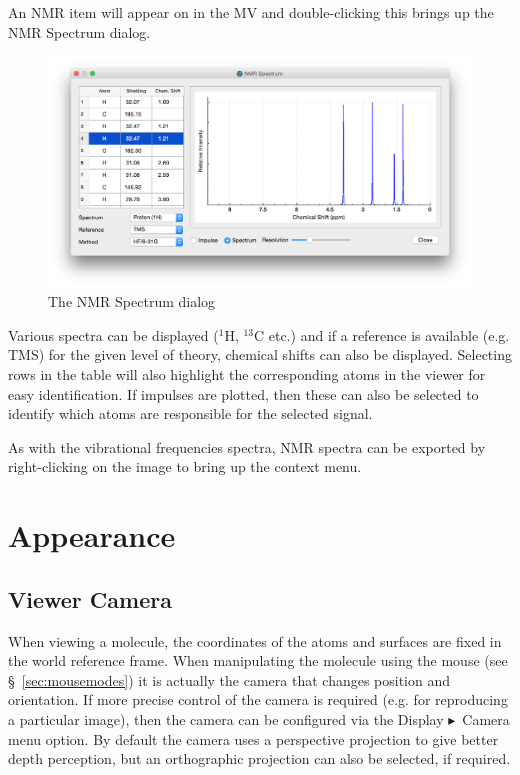\documentclass[a4paper,12pt]{article}
\newcommand{\bt}{\ensuremath{\blacktriangleright}}
\begin{document}
\newpage
An NMR item will appear on in the MV and double-clicking this brings up the NMR
Spectrum dialog.
\begin{figure}[h]
\begin{center}
\includegraphics[scale=0.35]{figures/NmrConfigurator.png}
\caption{The NMR Spectrum dialog}
\end{center}
\end{figure}

Various spectra can be displayed ($^1$H, $^{13}$C etc.) and if 
a reference is available (e.g. TMS) for the given level of theory, 
chemical shifts can also be displayed.  Selecting rows in the table
will also highlight the corresponding atoms in the viewer for easy
identification.  If impulses are plotted, then these can also be selected
to identify which atoms are responsible for the selected signal.

As with the vibrational frequencies spectra, NMR spectra can be exported
by right-clicking on the image to bring up the context menu.


\newpage
\section{Appearance}

\subsection{Viewer Camera}

When viewing a molecule, the coordinates of the atoms and surfaces are fixed in
the world reference frame.  When manipulating the molecule using the mouse (see
\S\ \ref{sec:mousemodes}) it is actually the camera that changes position and
orientation.  If more precise control of the camera is required (e.g. for
reproducing a particular image), then the camera can be configured via the
Display \bt\ Camera menu option.  By default the camera uses a perspective
projection to give better depth perception, but an orthographic projection can
also be selected, if required.
\end{document}
